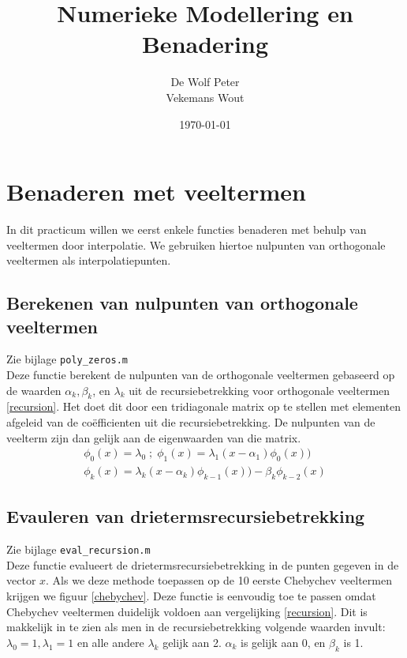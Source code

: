 \documentclass[a4paper, 12pt, titlepage]{report}
\begin{document}
\title{\textbf{Numerieke Modellering en Benadering}}
\author{De Wolf Peter\\ Vekemans Wout}

\date{\today}
\begin{titlepage}
	\maketitle
	\thispagestyle{empty}
\end{titlepage}

\newpage
\tableofcontents

\listoffigures

\newpage
\section{Benaderen met veeltermen}
In dit practicum willen we eerst enkele functies benaderen met behulp van veeltermen door interpolatie. We gebruiken hiertoe nulpunten van orthogonale veeltermen als interpolatiepunten.
\subsection{Berekenen van nulpunten van orthogonale veeltermen}
Zie bijlage \texttt{poly\_zeros.m}\\
Deze functie berekent de nulpunten van de orthogonale veeltermen gebaseerd op de waarden $\alpha_k, \beta_k$, en $\lambda_k$ uit de recursiebetrekking voor orthogonale veeltermen \eqref{recursion}. Het doet dit door een tridiagonale matrix op te stellen met elementen afgeleid van de co\"efficienten uit die recursiebetrekking. De nulpunten van de veelterm zijn dan gelijk aan de eigenwaarden van die matrix.\\
\begin{subequations} \label{recursion}
\begin{align}
\phi_0(x) = \lambda_0\; ;\; \phi_1(x) = \lambda_1(x-\alpha_1)\phi_0(x))\\
\phi_k(x) = \lambda_k(x-\alpha_k)\phi_{k-1}(x))-\beta_k\phi_{k-2}(x)
\end{align}
\end{subequations}

\subsection{Evauleren van drietermsrecursiebetrekking}
Zie bijlage \texttt{eval\_recursion.m}\\
Deze functie evalueert de drietermsrecursiebetrekking in de punten gegeven in de vector $x$. Als we deze methode toepassen op de 10 eerste Chebychev veeltermen krijgen we figuur \ref{chebychev}. Deze functie is eenvoudig toe te passen omdat Chebychev veeltermen duidelijk voldoen aan vergelijking \eqref{recursion}. Dit is makkelijk in te zien als men in de recursiebetrekking volgende waarden invult: $\lambda_0=1, \lambda_1=1$ en alle andere $\lambda_k$ gelijk aan 2. $\alpha_k$ is gelijk aan 0, en $\beta_k$ is 1. \\
\end{document}
